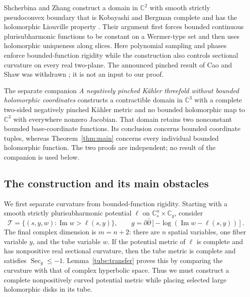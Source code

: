 Shcherbina and Zhang construct a domain in $\mathbb C^2$ with smooth
strictly pseudoconvex boundary that is Kobayashi and Bergman complete
and has the holomorphic Liouville property
\citep[Main Theorem and Section~6]{ShcherbinaZhang2021}. Their argument
first forces bounded continuous plurisubharmonic functions to be constant on a
Wermer-type set and then uses holomorphic uniqueness along slices.
Here polynomial sampling and phases enforce bounded-function rigidity
while the construction also controls sectional curvature on every
real two-plane. The announced pinched result of Cao and Shaw
was withdrawn \citep{CaoShawWithdrawn}; it is not an input to our proof.

The separate companion \emph{A negatively pinched K\"ahler threefold
without bounded holomorphic coordinates}
\citep[Theorem~1.1]{OpenAIPinchedThreefold2026} constructs a contractible
domain in $\mathbb C^3$ with a complete two-sided negatively pinched
K\"ahler metric and no bounded holomorphic map to $\mathbb C^3$ with
everywhere nonzero Jacobian. That domain retains two nonconstant bounded
base-coordinate functions. Its conclusion concerns bounded coordinate
tuples, whereas Theorem~\ref{thm:main} concerns every individual bounded
holomorphic function. The two proofs are independent; no result of the
companion is used below.

\subsection{The construction and its main obstacles}

We first separate curvature from bounded-function rigidity. Starting with
a smooth strictly plurisubharmonic potential $\ell$ on
$\mathbb C^{n}_s\times\mathbb C_y$, consider
\begin{equation}\label{eq:intro-tube}
 \mathcal T=\{(s,y,w):\operatorname{Im}w>\ell(s,y)\},
 \qquad g=\partial\bar\partial
       [-\log(\operatorname{Im}w-\ell(s,y))].
\end{equation}
The final complex dimension is $m=n+2$: there are $n$ spatial variables,
one fiber variable $y$, and the tube variable $w$.
If the potential metric of $\ell$ is complete and has nonpositive real
sectional curvature, then the tube metric is complete and satisfies
$\operatorname{Sec}_g\le-1$. Lemma~\ref{tube:transfer} proves this by
comparing the curvature with that of complex hyperbolic space. Thus
we must construct a complete nonpositively curved potential metric
while placing selected large holomorphic disks in its tube.

